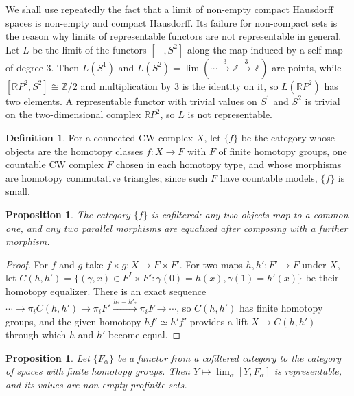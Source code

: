 \documentclass[11pt]{amsart}
\theoremstyle{plain}
\newtheorem{proposition}[theorem]{Proposition}
\theoremstyle{definition}
\newtheorem{definition}[theorem]{Definition}
\numberwithin{equation}{section}
\newcommand{\Z}{\mathbb{Z}}
\newcommand{\RP}{\mathbb{R}P}
\begin{document}
We shall use repeatedly the fact that a limit of non-empty compact Hausdorff spaces is non-empty and compact Hausdorff.
Its failure for non-compact sets is the reason why limits of representable functors are not representable in general.
Let $L$ be the limit of the functors $[-,S^2]$ along the map induced by a self-map of degree $3$.
Then $L(S^1)$ and $L(S^2)=\lim(\cdots\xrightarrow3\Z\xrightarrow3\Z)$ are points, while $[\RP^2,S^2]\cong\Z/2$ and multiplication by $3$ is the identity on it, so $L(\RP^2)$ has two elements.
A representable functor with trivial values on $S^1$ and $S^2$ is trivial on the two-dimensional complex $\RP^2$, so $L$ is not representable.

\begin{definition}
For a connected CW complex $X$, let $\{f\}$ be the category whose objects are the homotopy classes $f\colon X\to F$ with $F$ of finite homotopy groups, one countable CW complex $F$ chosen in each homotopy type, and whose morphisms are homotopy commutative triangles; since such $F$ have countable models, $\{f\}$ is small.
\end{definition}

\begin{proposition}\label{prop:cofiltered}
The category $\{f\}$ is cofiltered: any two objects map to a common one, and any two parallel morphisms are equalized after composing with a further morphism.
\end{proposition}

\begin{proof}
For $f$ and $g$ take $f\times g\colon X\to F\times F'$.
For two maps $h,h'\colon F'\to F$ under $X$, let $C(h,h')=\{(\gamma,x)\in F^I\times F':\gamma(0)=h(x),\gamma(1)=h'(x)\}$ be their homotopy equalizer.
There is an exact sequence $\cdots\to\pi_iC(h,h')\to\pi_iF'\xrightarrow{h_*-h'_*}\pi_iF\to\cdots$, so $C(h,h')$ has finite homotopy groups, and the given homotopy $hf'\simeq h'f'$ provides a lift $X\to C(h,h')$ through which $h$ and $h'$ become equal.
\end{proof}

\begin{proposition}\label{prop:limitrep}
Let $\{F_\alpha\}$ be a functor from a cofiltered category to the category of spaces with finite homotopy groups.
Then $Y\mapsto\lim_\alpha[Y,F_\alpha]$ is representable, and its values are non-empty profinite sets.
\end{proposition}
\end{document}
